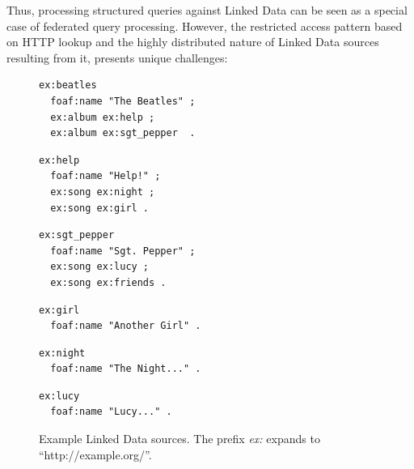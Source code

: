 Thus, processing structured queries against Linked Data can be seen as
a special case of federated query processing. However, the restricted
access pattern based on HTTP lookup and the highly distributed nature
of Linked Data sources resulting from it, presents unique challenges:

\begin{figure}[ht]
  \centering
  \begin{minipage}{0.32\linewidth}
\begin{lstlisting}[breaklines=true,language=ttl,linewidth=0.98\linewidth,frame=single,title=http://example.org/beatles]
ex:beatles 
  foaf:name "The Beatles" ;
  ex:album ex:help ;
  ex:album ex:sgt_pepper  .
\end{lstlisting}
  \end{minipage}
  \begin{minipage}{0.32\linewidth}
\begin{lstlisting}[breaklines=true,language=ttl,linewidth=0.98\linewidth,frame=single,title=http://example.org/help]
ex:help 
  foaf:name "Help!" ;
  ex:song ex:night ;
  ex:song ex:girl .
\end{lstlisting}
  \end{minipage}
  \begin{minipage}{0.32\linewidth}
\begin{lstlisting}[breaklines=true,language=ttl,linewidth=0.98\linewidth,frame=single,title=http://example.org/sgt\_pepper]
ex:sgt_pepper
  foaf:name "Sgt. Pepper" ;
  ex:song ex:lucy ;
  ex:song ex:friends .
\end{lstlisting}
  \end{minipage}
  \begin{minipage}{0.32\linewidth}
\begin{lstlisting}[breaklines=false,language=ttl,frame=single,linewidth=0.98\linewidth,title=http://example.org/girl]
ex:girl
  foaf:name "Another Girl" .

\end{lstlisting}
  \label{fig:example}
  \end{minipage}
  \begin{minipage}{0.32\linewidth}
\begin{lstlisting}[breaklines=true,language=ttl,frame=single,linewidth=0.98\linewidth,showlines=true,title=http://example.org/night]
ex:night 
  foaf:name "The Night..." .
\end{lstlisting}
  \end{minipage}
  \begin{minipage}{0.32\linewidth}
\begin{lstlisting}[breaklines=true,language=ttl,frame=single,showlines=true,title=http://example.org/lucy]
ex:lucy
  foaf:name "Lucy..." .
\end{lstlisting}
  \end{minipage}

  \caption{Example Linked Data sources. The prefix \emph{ex:} expands
    to ``http://example.org/''.}
  \label{fig:sources}
\end{figure}

